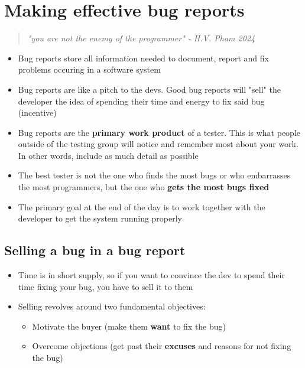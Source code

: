 \documentclass[12pt]{book}
\begin{document}
\section*{Making effective bug reports}

\begin{quote}
    \textit{"you are not the enemy of the programmer" - H.V. Pham 2024}
\end{quote}

\begin{itemize}
    \item Bug reports store all information needed to document, report and fix problems occuring in a software system
    \item Bug reports are like a pitch to the devs. Good bug reports will "sell" the developer the idea of spending their time and energy to fix said bug (incentive)
    \item Bug reports are the \textbf{primary work product} of a tester. This is what people outside of the testing group will notice and remember most about your work. In other words, include as much detail as possible
    \item The best tester is not the one who finds the most bugs or who embarrasses the most programmers, but the one who \textbf{gets the most bugs fixed}
    \item The primary goal at the end of the day is to work together with the developer to get the system running properly
\end{itemize}

\subsection*{Selling a bug in a bug report}

\begin{itemize}
    \item Time is in short supply, so if you want to convince the dev to spend their time fixing your bug, you have to sell it to them
    \item Selling revolves around two fundamental objectives:
    \begin{itemize}
        \item Motivate the buyer (make them \textbf{want} to fix the bug)
        \item Overcome objections (get past their \textbf{excuses} and reasons for not fixing the bug)
    \end{itemize} 
\end{itemize}
\end{document}
